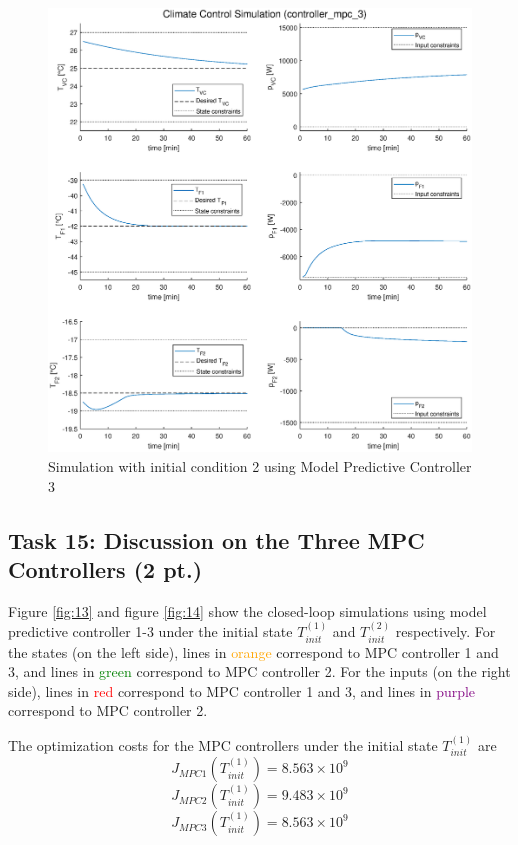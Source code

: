\documentclass[a4paper,twoside,11pt]{article}
\numberwithin{equation}{section}
\begin{document}
\newpage

\begin{figure}[ht]
\centering
\includegraphics[scale = 0.58]{image/14-2.eps}
\caption{Simulation with initial condition 2 using Model Predictive Controller 3}
\label{fig:12}
\end{figure}

\newpage

\subsection{Task 15: Discussion on the Three MPC Controllers (2 pt.)}

Figure \ref{fig:13} and figure \ref{fig:14} show the closed-loop simulations using model predictive controller 1-3 under the initial state $T^{(1)}_{init}$ and $T^{(2)}_{init}$ respectively. For the states (on the left side), lines in \textcolor{ORANGE}{orange} correspond to MPC controller 1 and 3, and lines in \textcolor{GREEN}{green} correspond to MPC controller 2. For the inputs (on the right side), lines in \textcolor{RED}{red} correspond to MPC controller 1 and 3, and lines in \textcolor{PURPLE}{purple} correspond to MPC controller 2. 

The optimization costs for the MPC controllers under the initial state $T^{(1)}_{init}$ are
\begin{equation*}
    J_{MPC1}(T^{(1)}_{init}) = 8.563\times10^9
\end{equation*}
\begin{equation*}
    J_{MPC2}(T^{(1)}_{init}) = 9.483\times10^9
\end{equation*}
\begin{equation*}
    J_{MPC3}(T^{(1)}_{init}) = 8.563\times10^9
\end{equation*}
\end{document}
